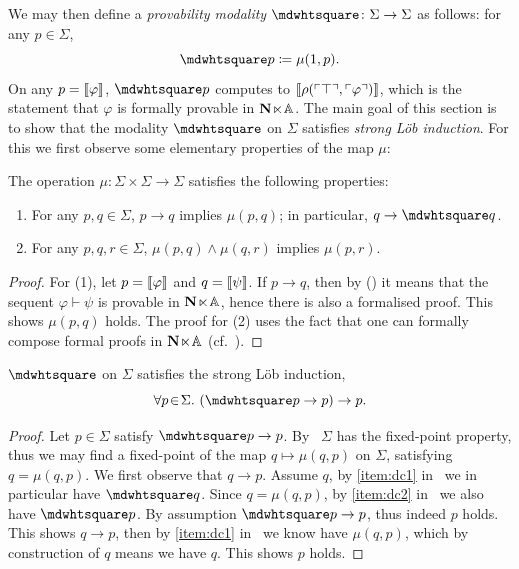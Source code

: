 We may then define a \emph{provability modality} $\bx \colon \Sigma \to \Sigma$ as follows: for any $p\in\Sigma$,
\[ \bx p \coloneq \mu(1,p). \]
On any $p = \llbracket\varphi\rrbracket$, $\bx p$ computes to $\llbracket\rho(\ulcorner \top \urcorner,\ulcorner \varphi \urcorner)\rrbracket$, which is the statement that $\varphi$ is formally provable in $\mathbf N\hspace{-.4ex}\ltimes\hspace{-.4ex}\mathbb{A}$. The main goal of this section is to show that the modality $\bx$ on $\Sigma$ satisfies \emph{strong L\"ob induction}. For this we first observe some elementary properties of the map $\mu$:

\begin{lemma}\label{lem:derivability}
  The operation $\mu \colon \Sigma \times \Sigma \to \Sigma$ satisfies the following properties:
  \begin{enumerate}
    \item\label{item:dc1} For any $p,q\in\Sigma$, $p \to q$ implies $\mu(p,q)$; in particular, $q \to \bx q$.
    \item\label{item:dc2} For any $p,q,r\in\Sigma$, $\mu(p,q) \wedge \mu(q,r)$ implies $\mu(p,r)$.
  \end{enumerate}
\end{lemma}
\begin{proof}
  For (1), let $p = \llbracket\varphi\rrbracket$ and $q = \llbracket\psi\rrbracket$. If $p \to q$, then by (\AxiomSQCA) it means that the sequent $\varphi \vdash \psi$ is provable in $\mathbf N\hspace{-.4ex}\ltimes\hspace{-.4ex}\mathbb{A}$, hence there is also a formalised proof. This shows $\mu(p,q)$ holds. The proof for (2) uses the fact that one can formally compose formal proofs in $\mathbf N\hspace{-.4ex}\ltimes\hspace{-.4ex}\mathbb{A}$ (cf.~\citet[Lem.~III.2.17]{Hájek_Pudlák_2017}).
\end{proof}

\begin{theorem}[L\"ob induction]\label{thm:lob}
  $\bx$ on $\Sigma$ satisfies the strong L\"ob induction,
  \[ \fa p\Sigma (\bx p \to p) \to p. \]
\end{theorem}
\begin{proof}
  Let $p\in\Sigma$ satisfy $\bx p \to p$. By~ $\Sigma$ has the fixed-point property, thus we may find a fixed-point of the map $q \mapsto \mu(q,p)$ on $\Sigma$, satisfying $q = \mu(q,p)$. We first observe that $q \to p$. Assume $q$, by \ref{item:dc1} in~ we in particular have $\bx q$. Since $q = \mu(q,p)$, by \ref{item:dc2} in~ we also have $\bx p $. By assumption $\bx p  \to p$, thus indeed $p$ holds. This shows $q \to p$, then by \ref{item:dc1} in~ we know have $\mu(q,p)$, which by construction of $q$ means we have $q$. This shows $p$ holds.
\end{proof}

